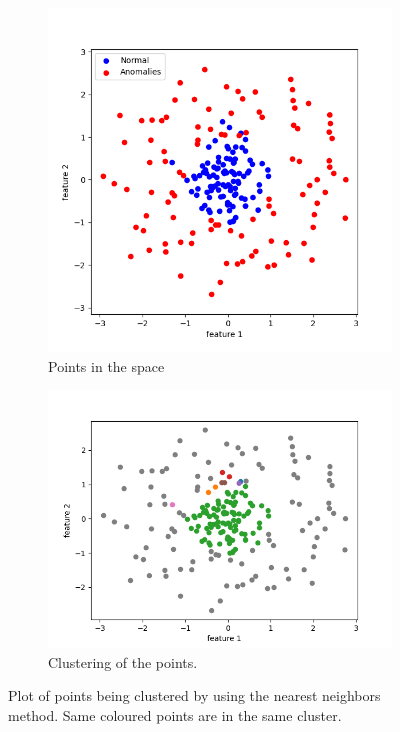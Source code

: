 \documentclass[oneside, a4paper, onecolumn, 11pt]{article}
\begin{document}
\begin{figure}[H]
  \centering
  \begin{subfigure}{0.33\textwidth}
      \centering
      \includegraphics[width=\linewidth]{images/or_class_nn_circle.png}
      \caption{Points in the space}
  \end{subfigure}
  \begin{subfigure}{0.35\textwidth}
      \centering
      \includegraphics[width=\linewidth]{images/actual_nn_circle.png}
      \caption{Clustering of the points.}
  \end{subfigure}
  \caption{Plot of points being clustered by using the nearest neighbors method. Same coloured points are in the same cluster.}
  \label{fig:nn_circle}
\end{figure}
\end{document}
